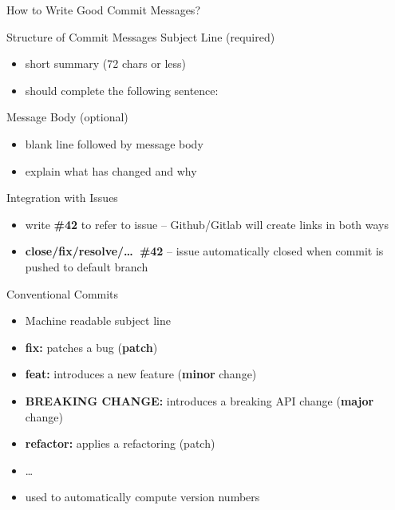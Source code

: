 \begin{frame}{How to Write Good Commit Messages?}
	\begin{fancycolumns}
		\begin{definition}{Structure of Commit Messages }
			Subject Line (required)
			\vspace{-1mm}
			\begin{itemize}
				\item short summary (72 chars or less)
				\item should complete the following sentence:\\
			\end{itemize}
			
			Message Body (optional)
			\vspace{-1mm}
			\begin{itemize}
				\item blank line followed by message body
				\item explain what has changed and why
			\end{itemize}
		\end{definition}
		\vspace{-1mm}
		\begin{note}{Integration with Issues }
			\begin{itemize}
				\item write \textbf{\#42} to refer to issue -- Github/Gitlab will create links in both ways
				\item \textbf{close/fix/resolve/\ldots\ \#42} -- issue automatically closed when commit is pushed to default branch
			\end{itemize}
		\end{note}
		\nextcolumn
		\begin{definition}{Conventional Commits }
			\begin{itemize}
				\item Machine readable subject line
				\item \textbf{fix:} patches a bug (\textbf{patch})
				\item \textbf{feat:} introduces a new feature (\textbf{minor} change)
				\item \textbf{BREAKING CHANGE:} introduces a breaking API change (\textbf{major} change)
				\item \textbf{refactor:} applies a refactoring (patch)
				\item \ldots
				\item used to automatically compute version numbers
			\end{itemize}
		\end{definition}
	\end{fancycolumns}
\end{frame}

